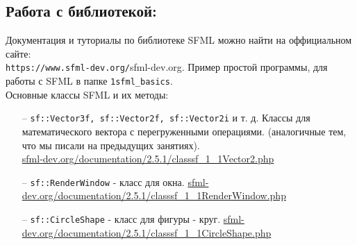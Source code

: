 \documentclass{article}
\begin{document}
\subsection*{Работа с библиотекой:}
Документация и туториалы по библиотеке SFML можно найти на оффициальном сайте:\\ \texttt{https://www.sfml-dev.org/}{sfml-dev.org}. Пример простой программы, для работы с SFML в папке \texttt{1sfml\_basics}. \\
Основные классы SFML и их методы:
\begin{itemize}
\item[--] \texttt{sf::Vector3f, sf::Vector2f, sf::Vector2i} и т. д. Классы для математического вектора с перегруженными операциями. (аналогичные тем, что мы писали на предыдущих занятиях). \\
\href{https://www.sfml-dev.org/documentation/2.5.1/classsf_1_1Vector2.php}{sfml-dev.org/documentation/2.5.1/classsf\_1\_1Vector2.php}
\item[--] \texttt{sf::RenderWindow} - класс для окна.
\href{https://www.sfml-dev.org/documentation/2.5.1/classsf_1_1RenderWindow.php}{sfml-dev.org/documentation/2.5.1/classsf\_1\_1RenderWindow.php}
\item[--] \texttt{sf::CircleShape} - класс для фигуры - круг.
\href{https://www.sfml-dev.org/documentation/2.5.1/classsf_1_1CircleShape.php}{sfml-dev.org/documentation/2.5.1/classsf\_1\_1CircleShape.php}

\end{itemize}
\end{document}
